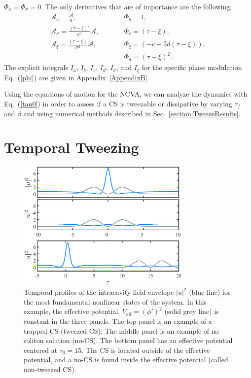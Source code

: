 \documentclass[aps,floatfix,showpacs,preprintnumbers,twocolumn,nofootinbib]{revtex4}
\begin{document}
$\Phi_a = \Phi_{\sigma} = 0$.  The only derivatives that are of importance are the following;
\begin{eqnarray}
\mathcal{A}_a = \frac{\mathcal{A}}{a}, \quad &&  \quad \Phi_b = 1,\nonumber \\
\mathcal{A}_{\sigma} = \frac{(\tau - \xi)^2}{\sigma^3} \mathcal{A}, \quad &&  \quad \Phi_c = (\tau-\xi), \nonumber \\
\mathcal{A}_{\xi} = \frac{(\tau-\xi)}{\sigma^2} \mathcal{A}, \quad&&   \quad \Phi_{\xi} = (-c - 2d(\tau - \xi)), \nonumber \\
&& \quad \Phi_d = (\tau- \xi)^2.  \nonumber 
\end{eqnarray}
The explicit integrals $I_a$, $I_b$, $I_c$, $I_d$, $I_{\sigma}$, and $I_{\xi}$ for the specific phase modulation Eq.~(\ref{phi}) are given in Appendix~\ref{AppendixB}.

Using the equations of motion for the NCVA, we can analyze the dynamics with Eq.~(\ref{tau0}) in order to assess if a CS is tweezable or dissipative by varying $\tau_f$ and $\beta$ and using numerical methods described in Sec.~\ref{section:TweezeResults}.


\section{Temporal Tweezing
\label{section:TweezeResults}}

\begin{figure}[t!]
\centering
\includegraphics[width=8.5cm]{threeStates.eps}
\caption[Temporal Profiles of Fundamental States]{Temporal profiles of the intracavity field envelope $|u|^2$ (blue line) for the most fundamental nonlinear states of the system.  In this example, the effective potential, $V_{\mathrm{eff}} = (\phi')^2$ (solid grey line) is constant in the three panels.  The top panel is an example of a trapped CS (tweezed CS).  The middle panel is an example of no soliton solution (no-CS).  The bottom panel has an effective potential centered at $\tau_0 = 15$.  The CS is located outside of the effective potential, and a no-CS is found inside the effective potential (called non-tweezed CS).  
}
\label{fig:threeStates}
\end{figure}
\end{document}
